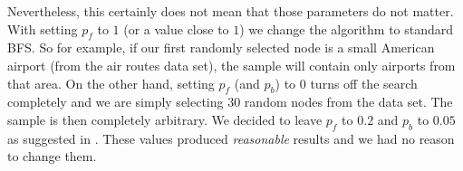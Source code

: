 Nevertheless, this certainly does not mean that those parameters do not matter. With setting $p_f$ to $1$ (or a value close to $1$) we change the algorithm to standard BFS. So for example, if our first randomly selected node is a small American airport (from the air routes data set), the sample will contain only airports from that area. On the other hand, setting $p_f$ (and $p_b$) to $0$ turns off the search completely and we are simply selecting 30 random nodes from the data set. The sample is then completely arbitrary. We decided to leave $p_f$ to $0.2$ and $p_b$ to $0.05$ as suggested in  \cite{leskovec2006sampling}. These values produced \emph{reasonable} results and we had no reason to change them.

